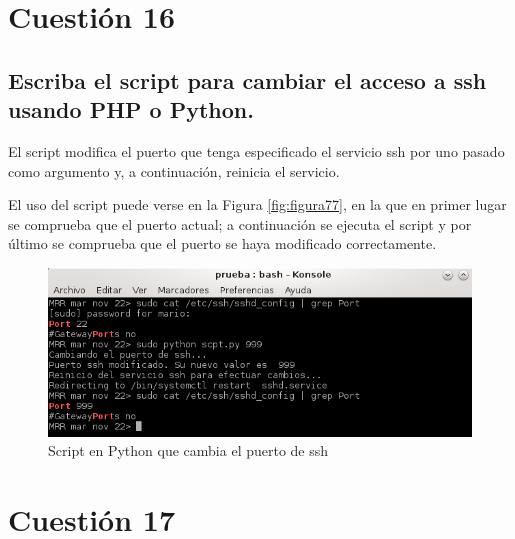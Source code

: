 \newpage

\section{Cuestión 16}
\subsection{Escriba el script para cambiar el acceso a ssh usando
PHP o Python.}
\cite{enlace29}



El script modifica el puerto que tenga especificado el servicio ssh por uno pasado como argumento y, a continuación, reinicia el servicio.

\newpage

El uso del script puede verse en la Figura \ref{fig:figura77}, en la que en primer lugar se comprueba que el puerto actual; a continuación se ejecuta el script y por último se comprueba que el puerto se haya modificado correctamente.

\begin{figure}[H] %
	\centering
	\includegraphics[scale=0.9]{figuras/figura79.png} 
	\caption{Script en Python que cambia el puerto de ssh}
	\label{fig:figura79}
\end{figure}

\newpage

\section{Cuestión 17}
